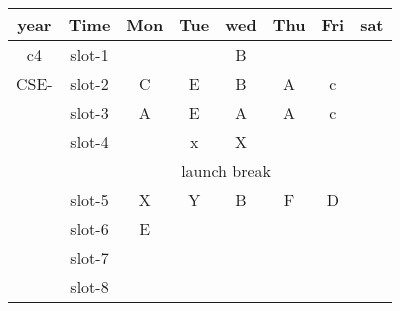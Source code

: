 \documentclass{article}
\begin{document}
	\begin{table}[h]
		
		\centering
		\begin{tabular}{|c|c|c|c|c|c|c|c|}
			\hline
			\textbf{year} & \textbf{Time} &	\textbf{Mon} &\textbf{Tue} & \textbf{wed} & \textbf{Thu} & 	\textbf{Fri} &\textbf{sat}\\
			\hline
			c4 & slot-1 &  &  &\cellcolor{red}B &   &   &\\
			\hline
			CSE- & slot-2 &\cellcolor{orange}C  &\cellcolor{yellow}E & \cellcolor{red}B & \cellcolor{pink}A & \cellcolor{orange}c &\\
			\hline
			 & slot-3 &\cellcolor{pink}A  &\cellcolor{yellow}E & \cellcolor{pink}A & \cellcolor{pink}A & \cellcolor{orange}c &\\
			 \hline
			 & slot-4 & &\cellcolor{green}x & \cellcolor{green}X &  &  &\\
			 \hline
			 &\multicolumn{7}{|c|}{launch break}\\	
			 \hline
			  & slot-5 &\cellcolor{green}X & \cellcolor{blue}Y & \cellcolor{Red}B & \cellcolor{yellow}F & \cellcolor{skyblue}D & \\
			  \hline 
			   & slot-6 &\cellcolor{yellow}E & \cellcolor{blue} & \cellcolor{Red} & \cellcolor{yellow} & \cellcolor{skyblue} & \\
			  \hline 
			  & slot-7 & & \cellcolor{blue} & \cellcolor{Red} & \cellcolor{yellow} & \cellcolor{skyblue} & \\
			  \hline 
			   & slot-8 & &  &  & &  & \\
			  \hline 
		\end{tabular}
	\end{table}
	
\end{document}
